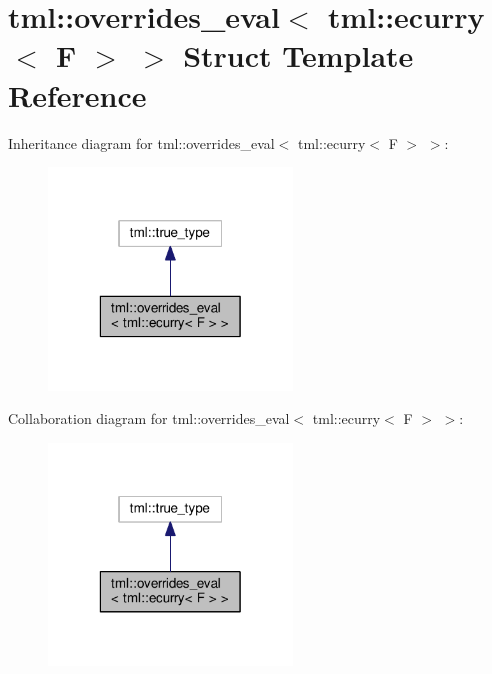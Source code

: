 \hypertarget{structtml_1_1overrides__eval_3_01tml_1_1ecurry_3_01_f_01_4_01_4}{\section{tml\+:\+:overrides\+\_\+eval$<$ tml\+:\+:ecurry$<$ F $>$ $>$ Struct Template Reference}
\label{structtml_1_1overrides__eval_3_01tml_1_1ecurry_3_01_f_01_4_01_4}
}


Inheritance diagram for tml\+:\+:overrides\+\_\+eval$<$ tml\+:\+:ecurry$<$ F $>$ $>$\+:
\nopagebreak
\begin{figure}[H]
\begin{center}
\leavevmode
\includegraphics[width=184pt]{structtml_1_1overrides__eval_3_01tml_1_1ecurry_3_01_f_01_4_01_4__inherit__graph}
\end{center}
\end{figure}


Collaboration diagram for tml\+:\+:overrides\+\_\+eval$<$ tml\+:\+:ecurry$<$ F $>$ $>$\+:
\nopagebreak
\begin{figure}[H]
\begin{center}
\leavevmode
\includegraphics[width=184pt]{structtml_1_1overrides__eval_3_01tml_1_1ecurry_3_01_f_01_4_01_4__coll__graph}
\end{center}
\end{figure}


